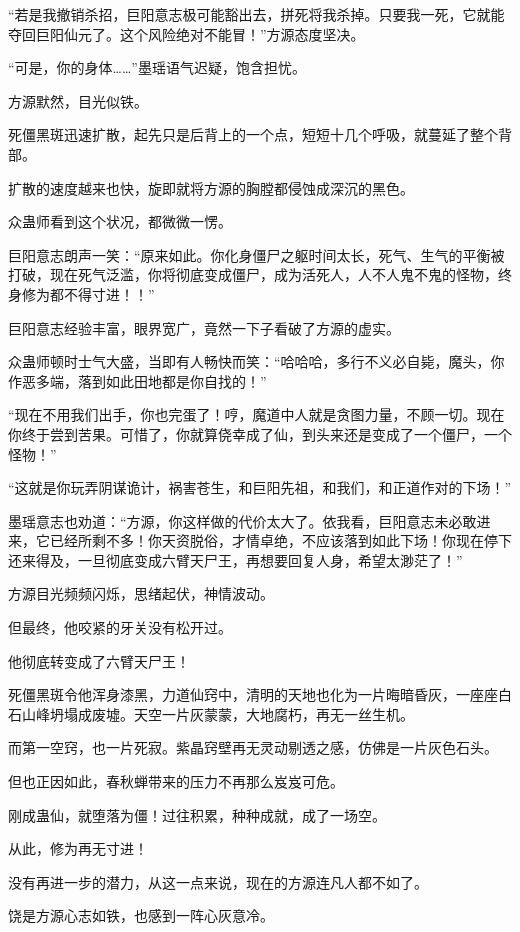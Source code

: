 \begin{this_body}
“若是我撤销杀招，巨阳意志极可能豁出去，拼死将我杀掉。只要我一死，它就能夺回巨阳仙元了。这个风险绝对不能冒！”方源态度坚决。

“可是，你的身体……”墨瑶语气迟疑，饱含担忧。

方源默然，目光似铁。

死僵黑斑迅速扩散，起先只是后背上的一个点，短短十几个呼吸，就蔓延了整个背部。

扩散的速度越来也快，旋即就将方源的胸膛都侵蚀成深沉的黑色。

众蛊师看到这个状况，都微微一愣。

巨阳意志朗声一笑：“原来如此。你化身僵尸之躯时间太长，死气、生气的平衡被打破，现在死气泛滥，你将彻底变成僵尸，成为活死人，人不人鬼不鬼的怪物，终身修为都不得寸进！！”

巨阳意志经验丰富，眼界宽广，竟然一下子看破了方源的虚实。

众蛊师顿时士气大盛，当即有人畅快而笑：“哈哈哈，多行不义必自毙，魔头，你作恶多端，落到如此田地都是你自找的！”

“现在不用我们出手，你也完蛋了！哼，魔道中人就是贪图力量，不顾一切。现在你终于尝到苦果。可惜了，你就算侥幸成了仙，到头来还是变成了一个僵尸，一个怪物！”

“这就是你玩弄阴谋诡计，祸害苍生，和巨阳先祖，和我们，和正道作对的下场！”

墨瑶意志也劝道：“方源，你这样做的代价太大了。依我看，巨阳意志未必敢进来，它已经所剩不多！你天资脱俗，才情卓绝，不应该落到如此下场！你现在停下还来得及，一旦彻底变成六臂天尸王，再想要回复人身，希望太渺茫了！”

方源目光频频闪烁，思绪起伏，神情波动。

但最终，他咬紧的牙关没有松开过。

他彻底转变成了六臂天尸王！

死僵黑斑令他浑身漆黑，力道仙窍中，清明的天地也化为一片晦暗昏灰，一座座白石山峰坍塌成废墟。天空一片灰蒙蒙，大地腐朽，再无一丝生机。

而第一空窍，也一片死寂。紫晶窍壁再无灵动剔透之感，仿佛是一片灰色石头。

但也正因如此，春秋蝉带来的压力不再那么岌岌可危。

刚成蛊仙，就堕落为僵！过往积累，种种成就，成了一场空。

从此，修为再无寸进！

没有再进一步的潜力，从这一点来说，现在的方源连凡人都不如了。

饶是方源心志如铁，也感到一阵心灰意冷。


\end{this_body}
